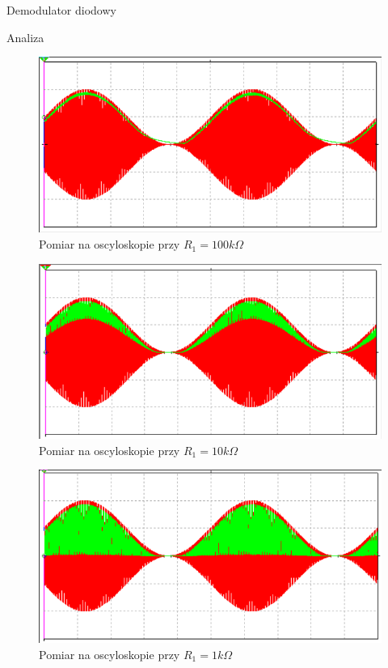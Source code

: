 \documentclass[a4paper]{scrartcl}
\begin{document}
\begin{section}{Demodulator diodowy}
\begin{subsection}{Analiza}
				\begin{figure}[!ht]
				\begin{center}
					\includegraphics[width=0.7\linewidth]{exercise-5-100k}
					\caption{Pomiar na oscyloskopie przy $R_{1} = 100k\Omega$}
					\label{fig:exercise-5-100k}
				\end{center}
				\end{figure}
				\begin{figure}[!ht]
				\begin{center}
					\includegraphics[width=0.7\linewidth]{exercise-5-10k}
					\caption{Pomiar na oscyloskopie przy $R_{1} = 10k\Omega$}
					\label{fig:exercise-5-10k}
				\end{center}
				\end{figure}
				\begin{figure}[!ht]
				\begin{center}
					\includegraphics[width=0.7\linewidth]{exercise-5-1k}
					\caption{Pomiar na oscyloskopie przy $R_{1} = 1k\Omega$}
					\label{fig:exercise-5-1k}
				\end{center}
				\end{figure}

\end{subsection}
\end{section}
\end{document}
